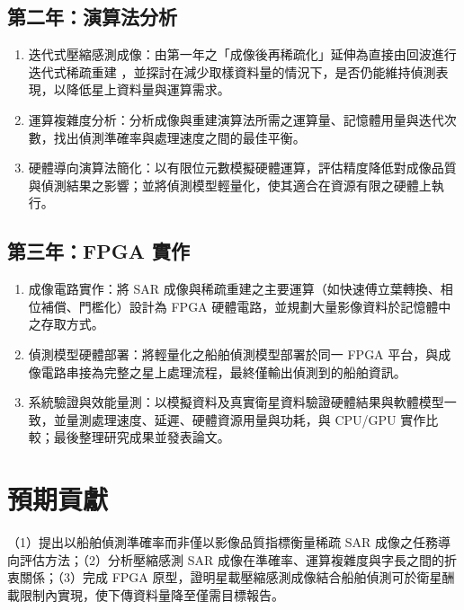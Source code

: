 \documentclass[11pt,fontset=none]{ctexart}
\begin{document}
\subsection{第二年：演算法分析}
\begin{enumerate}[label=(\arabic*), leftmargin=2.2em]
  \item 迭代式壓縮感測成像：由第一年之「成像後再稀疏化」延伸為直接由回波進行迭代式稀疏重建 \cite{fista, fang_approx_obs}，並探討在減少取樣資料量的情況下，是否仍能維持偵測表現，以降低星上資料量與運算需求。
  \item 運算複雜度分析：分析成像與重建演算法所需之運算量、記憶體用量與迭代次數，找出偵測準確率與處理速度之間的最佳平衡。
  \item 硬體導向演算法簡化：以有限位元數模擬硬體運算，評估精度降低對成像品質與偵測結果之影響；並將偵測模型輕量化，使其適合在資源有限之硬體上執行。
\end{enumerate}

\subsection{第三年：FPGA 實作}
\begin{enumerate}[label=(\arabic*), leftmargin=2.2em]
  \item 成像電路實作：將 SAR 成像與稀疏重建之主要運算（如快速傅立葉轉換、相位補償、門檻化）設計為 FPGA 硬體電路，並規劃大量影像資料於記憶體中之存取方式。
  \item 偵測模型硬體部署：將輕量化之船舶偵測模型部署於同一 FPGA 平台，與成像電路串接為完整之星上處理流程，最終僅輸出偵測到的船舶資訊。
  \item 系統驗證與效能量測：以模擬資料及真實衛星資料驗證硬體結果與軟體模型一致，並量測處理速度、延遲、硬體資源用量與功耗，與 CPU/GPU 實作比較；最後整理研究成果並發表論文。
\end{enumerate}

\newpage
\section{預期貢獻}

（1）提出以船舶偵測準確率而非僅以影像品質指標衡量稀疏 SAR 成像之任務導向評估方法；（2）分析壓縮感測 SAR 成像在準確率、運算複雜度與字長之間的折衷關係；（3）完成 FPGA 原型，證明星載壓縮感測成像結合船舶偵測可於衛星酬載限制內實現，使下傳資料量降至僅需目標報告。

\end{document}
